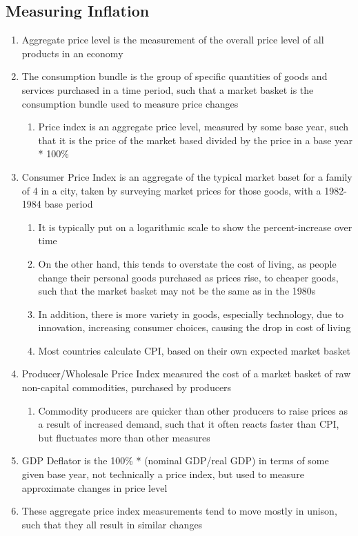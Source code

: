 \documentclass[11 pt, twoside]{article}
\begin{document}
\subsection{Measuring Inflation}
\begin{enumerate}
\item Aggregate price level is the measurement of the overall price level of all products in an economy
\item The consumption bundle is the group of specific quantities of goods and services purchased in a time period, such that a market basket is the consumption bundle used to measure price changes
\begin{enumerate}
\item Price index is an aggregate price level, measured by some base year, such that it is the price of the market based divided by the price in a base year * 100\%
\end{enumerate}
\item Consumer Price Index is an aggregate of the typical market baset for a family of 4 in a city, taken by surveying market prices for those goods, with a 1982-1984 base period
\begin{enumerate}
\item It is typically put on a logarithmic scale to show the percent-increase over time
\item On the other hand, this tends to overstate the cost of living, as people change their personal goods purchased as prices rise, to cheaper goods, such that the market basket may not be the same as in the 1980s
\item In addition, there is more variety in goods, especially technology, due to innovation, increasing consumer choices, causing the drop in cost of living
\item Most countries calculate CPI, based on their own expected market basket
\end{enumerate}
\item Producer/Wholesale Price Index measured the cost of a market basket of raw non-capital commodities, purchased by producers
\begin{enumerate}
\item Commodity producers are quicker than other producers to raise prices as a result of increased demand, such that it often reacts faster than CPI, but fluctuates more than other measures
\end{enumerate}
\item GDP Deflator is the 100\% * (nominal GDP/real GDP) in terms of some given base year, not technically a price index, but used to measure approximate changes in price level
\item These aggregate price index measurements tend to move mostly in unison, such that they all result in similar changes
\end{enumerate}
\end{document}
